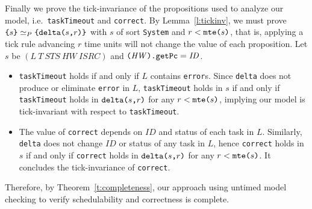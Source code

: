 \documentclass[journal]{IEEEtranTIE}
\begin{document}
\begin{IEEEproof}
Finally we prove the tick-invariance of the propositions used to
analyze our model, i.e.\ \verb|taskTimeout| and \verb|correct|. By
Lemma~\ref{l:tickinv}, we must prove
$\verb|{|s\verb|}|\simeq_P\verb|{|\deltaS{s}{r}\verb|}|$ with $s$ of
sort \verb|System| and $r<\texttt{mte(}s\texttt{)}$, that is, applying a tick rule
advancing $r$ time units will not change the value of each
proposition. Let $s$ be $(L~T~\mathit{STS}~\mathit{HW}~\mathit{ISRC})$
and $\verb|(|\mathit{HW}\verb|).getPc|=\mathit{ID}$.
\begin{itemize}
\item \verb|taskTimeout| holds if and only if $L$ contains
  \verb|error|s. Since \verb|delta| does not produce or eliminate
  \verb|error| in $L$, \verb|taskTimeout| holds in $s$ if and only if
  \verb|taskTimeout| holds in $\texttt{delta(}s\texttt{,}r\texttt{)}$ for any $r<\texttt{mte(}s\texttt{)}$,
  implying our model is tick-invariant with respect to
  \verb|taskTimeout|.
\item The value of \verb|correct| depends on $\mathit{ID}$ and
  status of each task in $L$. Similarly, \verb|delta| does not change
  $\mathit{ID}$ or status of any task in $L$, hence \verb|correct|
  holds in $s$ if and only if \verb|correct| holds in $\texttt{delta(}s\texttt{,}r\texttt{)}$
  for any $r<\texttt{mte(}s\texttt{)}$. It concludes the tick-invariance of
  \verb|correct|.
\end{itemize}

Therefore, by Theorem~\ref{t:completeness}, our approach using untimed
model checking to verify schedulability and correctness is complete.
\end{IEEEproof}


\end{document}
